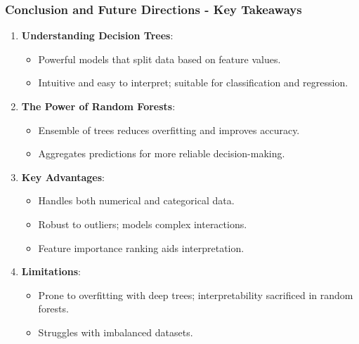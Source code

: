 \documentclass{beamer}
\begin{document}
\begin{frame}[fragile]
    \frametitle{Conclusion and Future Directions - Key Takeaways}

    \begin{enumerate}
        \item \textbf{Understanding Decision Trees}:
        \begin{itemize}
            \item Powerful models that split data based on feature values.
            \item Intuitive and easy to interpret; suitable for classification and regression.
        \end{itemize}

        \item \textbf{The Power of Random Forests}:
        \begin{itemize}
            \item Ensemble of trees reduces overfitting and improves accuracy.
            \item Aggregates predictions for more reliable decision-making.
        \end{itemize}

        \item \textbf{Key Advantages}:
        \begin{itemize}
            \item Handles both numerical and categorical data.
            \item Robust to outliers; models complex interactions.
            \item Feature importance ranking aids interpretation.
        \end{itemize}

        \item \textbf{Limitations}:
        \begin{itemize}
            \item Prone to overfitting with deep trees; interpretability sacrificed in random forests.
            \item Struggles with imbalanced datasets.
        \end{itemize}
    \end{enumerate}

\end{frame}
\end{document}
